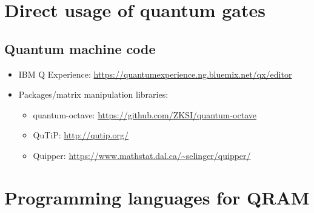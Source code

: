 \documentclass{beamer}
\begin{document}
\section{Direct usage of quantum gates}

\subsection{Quantum machine code}
\begin{frame}{\insertsection}{\insertsubsection}
    \begin{itemize}
    \item IBM Q Experience: 
    {\small\url{https://quantumexperience.ng.bluemix.net/qx/editor}}
    \item Packages/matrix manipulation libraries:
    \begin{itemize}
        \item quantum-octave: 
        {\small \url{https://github.com/ZKSI/quantum-octave}}
        \item QuTiP: {\small\url{http://qutip.org/}}
        \item Quipper: 
        {\small\url{https://www.mathstat.dal.ca/~selinger/quipper/}}
    \end{itemize}
    \end{itemize}
\end{frame}

\section{Programming languages for QRAM}

\end{document}
